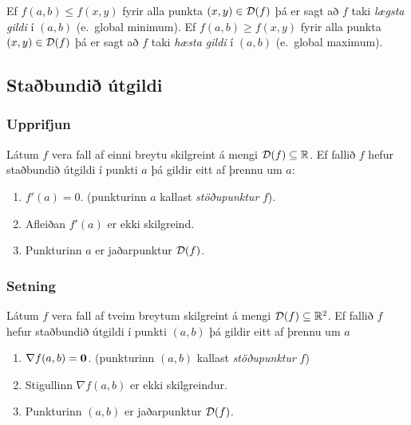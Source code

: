 \medskip
Ef $f(a,b)\leq f(x,y)$ fyrir alla punkta $(x,y)\in {\cal D}(f)$ þá er
sagt að $f$ taki {\em \color{red} lægsta gildi} í $(a,b)$ (e.~global minimum).
Ef $f(a,b)\geq f(x,y)$ fyrir alla punkta $(x,y)\in {\cal D}(f)$ þá er
sagt að $f$ taki {\em \color{red} hæsta gildi} í $(a,b)$ (e.~global maximum).






\subsection{Staðbundið útgildi} 

\subsubsection{Upprifjun  }
   Látum $f$ vera fall af einni breytu
skilgreint á mengi ${\cal D}(f)\subseteq {\mathbb R}$.  Ef fallið $f$ hefur
staðbundið útgildi í punkti $a$ þá gildir eitt af þrennu um $a$:

\begin {enumerate}
 \item $f'(a)=0$. \qquad (punkturinn $a$ kallast {\em \color{red} stöðupunktur} $f$).
 \item Afleiðan $f'(a)$ er ekki skilgreind.
 \item   Punkturinn $a$ er jaðarpunktur ${\cal D}(f)$.
\end {enumerate}





\subsubsection{Setning  }
 Látum $f$ vera fall af tveim breytum
skilgreint á mengi ${\cal D}(f)\subseteq {\mathbb R}^2$.  Ef fallið $f$ hefur
staðbundið útgildi í punkti $(a,b)$ þá gildir eitt af þrennu um $a$
\begin {enumerate}
 \item  $\nabla f(a,b)=\mbox{${\bf 0}$}$. \qquad (punkturinn $(a,b)$ kallast {\em \color{red}
     stöðupunktur} $f$) 
\item Stigullinn $\nabla f(a,b)$ er ekki skilgreindur.
\item Punkturinn $(a,b)$ er jaðarpunktur ${\cal D}(f)$.
\end {enumerate}





